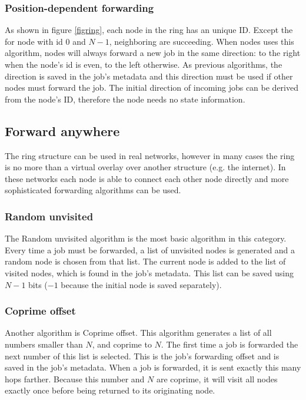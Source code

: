 \documentclass[10pt,a4paper]{article}
\begin{document}
\subsubsection*{Position-dependent forwarding}
As shown in figure \ref{figring}, each node in the ring has an unique ID. Except the for node with id $0$ and $N-1$, neighboring are succeeding. When nodes uses this algorithm, nodes will always forward a new job in the same direction: to the right when the node's id is even, to the left otherwise. As previous algorithms, the direction is saved in the job's metadata and this direction must be used if other nodes must forward the job. The initial direction of incoming jobs can be derived from the node's ID, therefore the node needs no state information.

\subsection{Forward anywhere}
The ring structure can be used in real networks, however in many cases the ring is no more than a virtual overlay over another structure (e.g. the internet). In these networks each node is able to connect each other node directly and more sophisticated forwarding algorithms can be used.

\subsubsection*{Random unvisited}
The Random unvisited algorithm is the most basic algorithm in this category. Every time a job must be forwarded, a list of unvisited nodes is generated and a random node is chosen from that list. The current node is added to the list of visited nodes, which is found in the job's metadata. This list can be saved using $N-1$ bits ($-1$ because the initial node is saved separately).

\subsubsection*{Coprime offset}
Another algorithm is Coprime offset. This algorithm generates a list of all numbers smaller than $N$, and coprime to $N$. The first time a job is forwarded the next number of this list is selected. This is the job's forwarding offset and is saved in the job's metadata. When a job is forwarded, it is sent exactly this many hops farther. Because this number and $N$ are coprime, it will visit all nodes exactly once before being returned to its originating node. 
\end{document}
